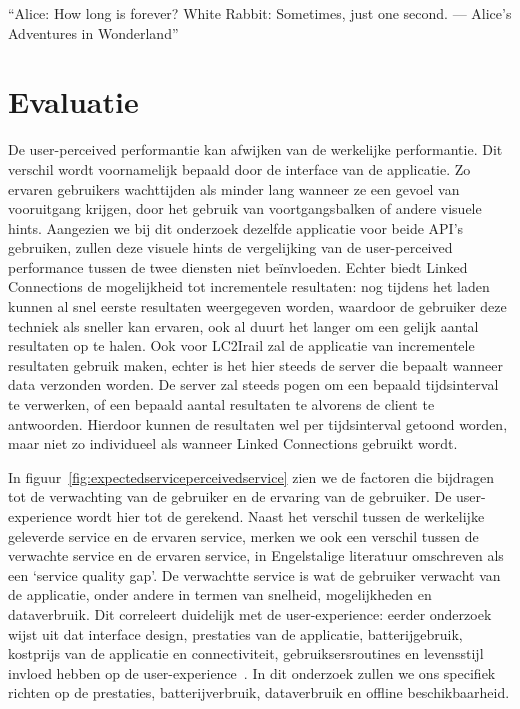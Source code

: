 \begin{savequote}[0.55\linewidth]
	``Alice: How long is forever? White Rabbit: Sometimes, just one second. —  Alice's Adventures in Wonderland''
\end{savequote}

\chapter{Evaluatie}

\label{chap:onderzoek}
De user-perceived performantie kan afwijken van de werkelijke performantie. Dit verschil wordt voornamelijk bepaald door de interface van de applicatie. Zo ervaren gebruikers wachttijden als minder lang wanneer ze een gevoel van vooruitgang krijgen, door het gebruik van voortgangsbalken of andere visuele hints. Aangezien we bij dit onderzoek dezelfde applicatie voor beide API's gebruiken, zullen deze visuele hints de vergelijking van de user-perceived performance tussen de twee diensten niet beïnvloeden. Echter biedt Linked Connections de mogelijkheid tot incrementele resultaten: nog tijdens het laden kunnen al snel eerste resultaten weergegeven worden, waardoor de gebruiker deze techniek als sneller kan ervaren, ook al duurt het langer om een gelijk aantal resultaten op te halen. Ook voor LC2Irail zal de applicatie van incrementele resultaten gebruik maken, echter is het hier steeds de server die bepaalt wanneer data verzonden worden. De server zal steeds pogen om een bepaald tijdsinterval te verwerken, of een bepaald aantal resultaten te  alvorens de client te antwoorden. Hierdoor kunnen de resultaten wel per tijdsinterval getoond worden, maar niet zo individueel als wanneer Linked Connections gebruikt wordt.

In figuur~\ref{fig:expectedserviceperceivedservice} zien we de factoren die bijdragen tot de verwachting van de gebruiker en de ervaring van de gebruiker. De user-experience wordt hier tot de  gerekend. Naast het verschil tussen de werkelijke geleverde service en de ervaren service, merken we ook een verschil tussen de verwachte service en de ervaren service, in Engelstalige literatuur omschreven als een `service quality gap'. De verwachtte service is wat de gebruiker verwacht van de applicatie, onder andere in termen van snelheid, mogelijkheden en dataverbruik. Dit correleert duidelijk met de user-experience: eerder onderzoek wijst uit dat interface design, prestaties van de applicatie, batterijgebruik, kostprijs van de applicatie en connectiviteit, gebruiksersroutines en levensstijl invloed hebben op de user-experience~\citep{ickin12}. In dit onderzoek zullen we ons specifiek richten op de prestaties, batterijverbruik, dataverbruik en offline beschikbaarheid.

